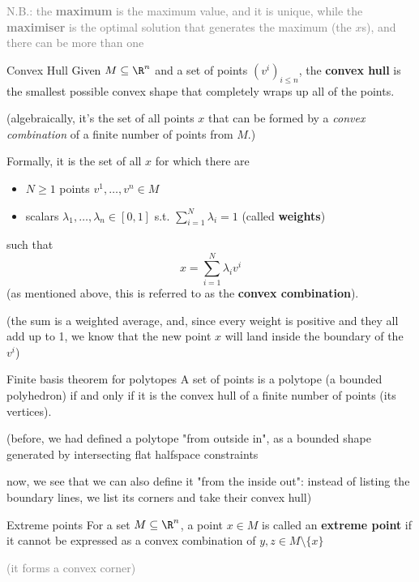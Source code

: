\documentclass[a4paper, 11pt]{report}
\newcommand{\Rn}{\R^{n}}
\begin{document}
    \textcolor{gray}{N.B.: the \textbf{maximum} is the maximum value, and it is unique, while the \textbf{maximiser} is the optimal solution that generates the maximum (the $x$s), and there can be more than one} 


\begin{defframe}{Convex Hull}{}
    \label{def:conv_hull}
    Given $M \subseteq \Rn$ and a set of points  $(v^{i})_{i \leq n}$, the \textbf{convex hull} is the smallest possible convex shape that completely wraps up all of the points.

    (algebraically, it's the set of all points $x$ that can be formed by a \textit{convex combination} of a finite number of points from $M$.)

    Formally, it is the set of all $x$ for which there are 
    \begin{itemize}
        \item $N \geq 1$ points $v^{1}, \dots, v^{n}\in M$ 
        \item scalars $\lambda_{1}, \dots, \lambda_{n} \in [0,1]$ s.t. $\sum_{i=1}^{N} \lambda_{i} = 1$ (called \textbf{weights})
    \end{itemize}
    such that
    $$
x = \sum_{i=1}^{N} \lambda_{i} v^{i}
    $$
    (as mentioned above, this is referred to as the \textbf{convex combination}).

    (the sum is a weighted average, and, since every weight is positive and they all add up to 1, we know that the new point $x$ will land inside the boundary of the $v^{i}$)

\end{defframe}

\begin{thmframe}{Finite basis theorem for polytopes}{}
    A set of points is a polytope (a bounded polyhedron) if and only if it is the convex hull of a finite number of points (its vertices). 

\begin{gframe}{}
    (before, we had defined a polytope "from outside in", as a bounded shape generated by intersecting flat halfspace constraints

now, we see that we can also define it "from the inside out": instead of listing the boundary lines, we list its corners and take their convex hull)
\end{gframe}
\end{thmframe}

\begin{defframe}{Extreme points}{}
    For a set $M \subseteq \Rn$, a point $x \in M$ is called an \textbf{extreme point} if it cannot be expressed as a convex combination of $y, z \in M \setminus \{{x\}}$

    \textcolor{gray}{(it forms a convex corner)}
\end{defframe}
\end{document}

